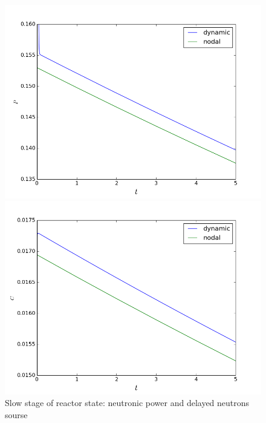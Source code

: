 \documentclass[a4paper]{jpconf}
\begin{document}
\begin{figure}[h]
\begin{center}
\begin{minipage}{0.49\linewidth}
    \includegraphics[width=1\linewidth] {15.png}
\end{minipage}
\hfill
\begin{minipage}{0.49\linewidth}
    \includegraphics[width=1\linewidth] {16.png}
\end{minipage}
\caption{Slow stage of reactor state: neutronic power and delayed neutrons sourse}
\label{fig:6}
\end{center}
\end{figure}


\clearpage
\end{document}
